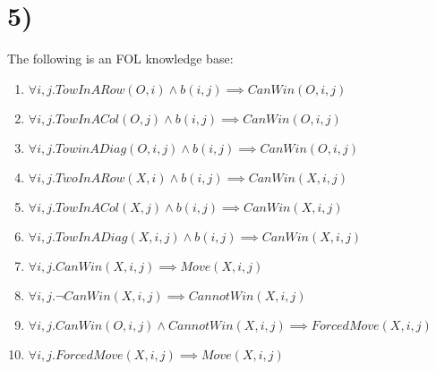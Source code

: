 \documentclass[22pt]{article}
\begin{document}
\section*{5)}

The following is an FOL knowledge base:

\begin{enumerate}
	\item $ \forall i, j. TowInARow(O, i) \land b(i, j) \implies CanWin(O, i, j) $
	\item $ \forall i, j. TowInACol(O, j) \land b(i, j) \implies CanWin(O, i, j) $
	\item $ \forall i, j. TowinADiag(O, i, j) \land b(i, j) \implies CanWin(O, i, j) $
	\item $ \forall i, j. TwoInARow(X, i) \land b(i, j) \implies CanWin(X, i, j) $
	\item $ \forall i, j. TowInACol(X, j) \land b(i, j) \implies CanWin(X, i, j) $
	\item $ \forall i, j. TowInADiag(X, i, j) \land b(i, j) \implies CanWin(X, i, j) $
	\item $ \forall i, j. CanWin(X, i, j) \implies Move(X, i, j) $
	\item $ \forall i, j. \neg CanWin(X, i, j) \implies CannotWin(X, i, j) $
	\item $ \forall i, j. CanWin(O, i, j) \land CannotWin(X, i, j) \implies ForcedMove(X, i, j) $
	\item $ \forall i, j. ForcedMove(X, i, j) \implies Move(X, i, j) $
\end{enumerate}
\end{document}
